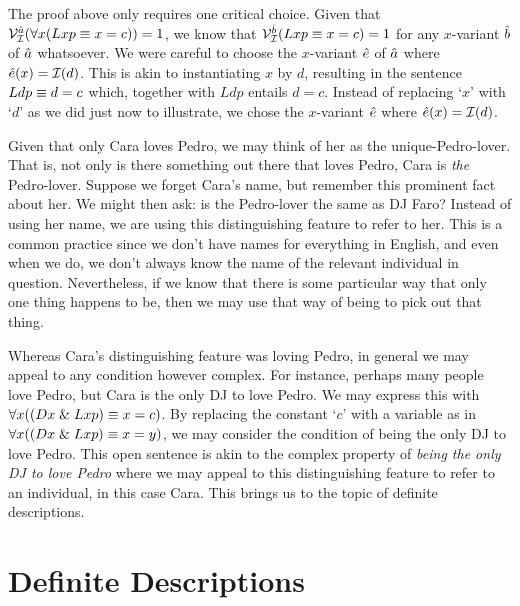 The proof above only requires one critical choice.
Given that $\mathcal{V}_{\mathcal{I}}^{\hat{a}}(\forall x(Lxp \equiv x=c))=1$, we know that $\mathcal{V}_{\mathcal{I}}^{\hat{b}}(Lxp \equiv x=c)=1$ for any $x$-variant $\hat{b}$ of $\hat{a}$ whatsoever.
We were careful to choose the $x$-variant $\hat{e}$ of $\hat{a}$ where $\hat{e}(x)=\mathcal{I}(d)$.
This is akin to instantiating $x$ by $d$, resulting in the sentence $Ldp \equiv d=c$ which, together with $Ldp$ entails $d=c$.
Instead of replacing `$x$' with `$d$' as we did just now to illustrate, we chose the $x$-variant $\hat{e}$ where $\hat{e}(x)=\mathcal{I}(d)$.

Given that only Cara loves Pedro, we may think of her as the unique-Pedro-lover.
That is, not only is there something out there that loves Pedro, Cara is \textit{the} Pedro-lover.
Suppose we forget Cara's name, but remember this prominent fact about her.
We might then ask: is the Pedro-lover the same as DJ Faro?
Instead of using her name, we are using this distinguishing feature to refer to her.
This is a common practice since we don't have names for everything in English, and even when we do, we don't always know the name of the relevant individual in question.
Nevertheless, if we know that there is some particular way that only one thing happens to be, then we may use that way of being to pick out that thing.

Whereas Cara's distinguishing feature was loving Pedro, in general we may appeal to any condition however complex.
For instance, perhaps many people love Pedro, but Cara is the only DJ to love Pedro.
We may express this with $\forall x((Dx \mathrel\& Lxp) \equiv x=c)$.
By replacing the constant `$c$' with a variable as in $\forall x((Dx \mathrel\& Lxp) \equiv x=y)$, we may consider the condition of being the only DJ to love Pedro.
This open sentence is akin to the complex property of \textit{being the only DJ to love Pedro} where we may appeal to this distinguishing feature to refer to an individual, in this case Cara.
This brings us to the topic of definite descriptions.





\section{Definite Descriptions}
  \label{sec.DefiniteDescription}

